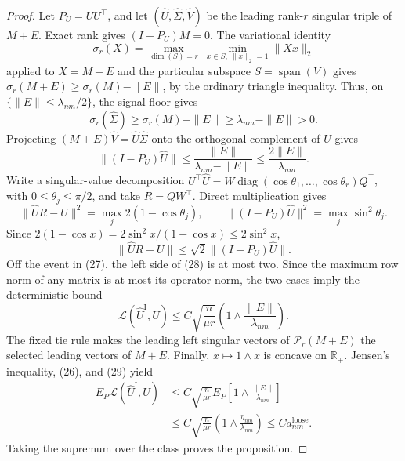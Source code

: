 \documentclass{article}
\begin{document}
\begin{proof}
Let \(P_U=UU^\top\), and let \((\widehat U,\widehat\Sigma,\widehat V)\) be the leading rank-\(r\) singular triple of \(M+E\).  Exact rank gives \((I-P_U)M=0\).  The variational identity
\[
 \sigma_r(X)=\max_{\dim(S)=r}\ \min_{x\in S,\ \|x\|_2=1}\|Xx\|_2
\]
applied to \(X=M+E\) and the particular subspace \(S=\operatorname{span}(V)\) gives \(\sigma_r(M+E)\ge\sigma_r(M)-\|E\|\), by the ordinary triangle inequality.  Thus, on \(\{\|E\|\le\lambda_{nm}/2\}\), the signal floor gives
\[
 \sigma_r(\widehat\Sigma)\ge\sigma_r(M)-\|E\|
 \ge\lambda_{nm}-\|E\|>0.
\]
Projecting \((M+E)\widehat V=\widehat U\widehat\Sigma\) onto the orthogonal complement of \(U\) gives
\[
 \|(I-P_U)\widehat U\|
 \le\frac{\|E\|}{\lambda_{nm}-\|E\|}
 \le\frac{2\|E\|}{\lambda_{nm}}.
 \tag{27}
\]
Write a singular-value decomposition \(U^\top\widehat U=W\operatorname{diag}(\cos\theta_1,\ldots,\cos\theta_r)Q^\top\), with \(0\le\theta_j\le\pi/2\), and take \(R=QW^\top\).  Direct multiplication gives
\[
 \|\widehat UR-U\|^2=\max_j2(1-\cos\theta_j),
 \qquad
 \|(I-P_U)\widehat U\|^2=\max_j\sin^2\theta_j.
\]
Since \(2(1-\cos x)=2\sin^2x/(1+\cos x)\le2\sin^2x\),
\[
 \|\widehat UR-U\|\le\sqrt2\|(I-P_U)\widehat U\|.
 \tag{28}
\]
Off the event in (27), the left side of (28) is at most two.  Since the maximum row norm of any matrix is at most its operator norm, the two cases imply the deterministic bound
\[
 \mathcal L(\widehat U^{\mathrm I},U)
 \le C\sqrt{\frac n{\mu r}}
 \left(1\wedge\frac{\|E\|}{\lambda_{nm}}\right).
 \tag{29}
\]
The fixed tie rule makes the leading left singular vectors of \(\mathcal P_r(M+E)\) the selected leading vectors of \(M+E\).  Finally, \(x\mapsto1\wedge x\) is concave on \(\mathbb R_+\).  Jensen's inequality, (26), and (29) yield
\[
 \begin{aligned}
 E_P\mathcal L(\widehat U^{\mathrm I},U)
 &\le C\sqrt{\frac n{\mu r}}
 E_P\left[1\wedge\frac{\|E\|}{\lambda_{nm}}\right]\\
 &\le C\sqrt{\frac n{\mu r}}
 \left(1\wedge\frac{\eta_{nm}}{\lambda_{nm}}\right)
 \le C a^{\mathrm{loose}}_{nm}.
 \end{aligned}
\]
Taking the supremum over the class proves the proposition.
\end{proof}
\end{document}
